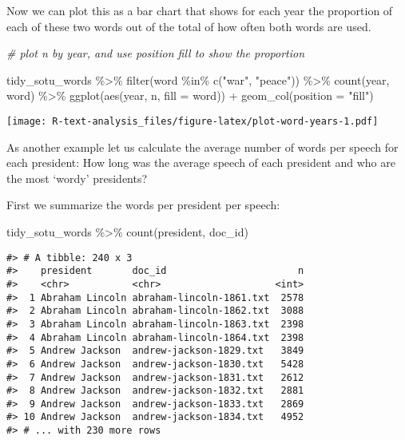 \documentclass[
]{book}
\newenvironment{Shaded}{\begin{snugshade}}{\end{snugshade}}
\newcommand{\AttributeTok}[1]{\textcolor[rgb]{0.77,0.63,0.00}{#1}}
\newcommand{\CommentTok}[1]{\textcolor[rgb]{0.56,0.35,0.01}{\textit{#1}}}
\newcommand{\FunctionTok}[1]{\textcolor[rgb]{0.00,0.00,0.00}{#1}}
\newcommand{\NormalTok}[1]{#1}
\newcommand{\SpecialCharTok}[1]{\textcolor[rgb]{0.00,0.00,0.00}{#1}}
\newcommand{\StringTok}[1]{\textcolor[rgb]{0.31,0.60,0.02}{#1}}
\begin{document}
Now we can plot this as a bar chart that shows for each year the proportion of each of these two words out of the total of how often both words are used.

\begin{Shaded}
\begin{Highlighting}[]
\CommentTok{\# plot n by year, and use position \textquotesingle{}fill\textquotesingle{} to show the proportion}

\NormalTok{tidy\_sotu\_words }\SpecialCharTok{\%\textgreater{}\%}
  \FunctionTok{filter}\NormalTok{(word }\SpecialCharTok{\%in\%} \FunctionTok{c}\NormalTok{(}\StringTok{"war"}\NormalTok{, }\StringTok{"peace"}\NormalTok{)) }\SpecialCharTok{\%\textgreater{}\%} 
  \FunctionTok{count}\NormalTok{(year, word) }\SpecialCharTok{\%\textgreater{}\%} 
  \FunctionTok{ggplot}\NormalTok{(}\FunctionTok{aes}\NormalTok{(year, n, }\AttributeTok{fill =}\NormalTok{ word)) }\SpecialCharTok{+}
    \FunctionTok{geom\_col}\NormalTok{(}\AttributeTok{position =} \StringTok{"fill"}\NormalTok{)}
\end{Highlighting}
\end{Shaded}

\texttt{[image: R-text-analysis\_files/figure-latex/plot-word-years-1.pdf]}

As another example let us calculate the average number of words per speech for each president: How long was the average speech of each president and who are the most `wordy' presidents?

First we summarize the words per president per speech:

\begin{Shaded}
\begin{Highlighting}[]
\NormalTok{tidy\_sotu\_words }\SpecialCharTok{\%\textgreater{}\%}
  \FunctionTok{count}\NormalTok{(president, doc\_id)}
\end{Highlighting}
\end{Shaded}

\begin{verbatim}
#> # A tibble: 240 x 3
#>    president       doc_id                       n
#>    <chr>           <chr>                    <int>
#>  1 Abraham Lincoln abraham-lincoln-1861.txt  2578
#>  2 Abraham Lincoln abraham-lincoln-1862.txt  3088
#>  3 Abraham Lincoln abraham-lincoln-1863.txt  2398
#>  4 Abraham Lincoln abraham-lincoln-1864.txt  2398
#>  5 Andrew Jackson  andrew-jackson-1829.txt   3849
#>  6 Andrew Jackson  andrew-jackson-1830.txt   5428
#>  7 Andrew Jackson  andrew-jackson-1831.txt   2612
#>  8 Andrew Jackson  andrew-jackson-1832.txt   2881
#>  9 Andrew Jackson  andrew-jackson-1833.txt   2869
#> 10 Andrew Jackson  andrew-jackson-1834.txt   4952
#> # ... with 230 more rows
\end{verbatim}
\end{document}
